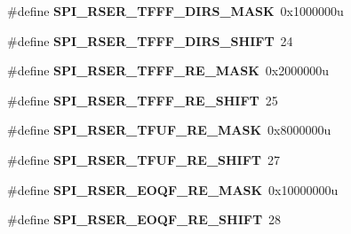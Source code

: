 \begin{DoxyCompactItemize}
\item 
\#define {\bfseries S\+P\+I\+\_\+\+R\+S\+E\+R\+\_\+\+T\+F\+F\+F\+\_\+\+D\+I\+R\+S\+\_\+\+M\+A\+SK}~0x1000000u\hypertarget{group__SPI__Register__Masks_ga01228112dcc4440aa1678eb55b97306e}{}\label{group__SPI__Register__Masks_ga01228112dcc4440aa1678eb55b97306e}

\item 
\#define {\bfseries S\+P\+I\+\_\+\+R\+S\+E\+R\+\_\+\+T\+F\+F\+F\+\_\+\+D\+I\+R\+S\+\_\+\+S\+H\+I\+FT}~24\hypertarget{group__SPI__Register__Masks_ga9f1684fdb2e7f9e9adb7afd07a3278da}{}\label{group__SPI__Register__Masks_ga9f1684fdb2e7f9e9adb7afd07a3278da}

\item 
\#define {\bfseries S\+P\+I\+\_\+\+R\+S\+E\+R\+\_\+\+T\+F\+F\+F\+\_\+\+R\+E\+\_\+\+M\+A\+SK}~0x2000000u\hypertarget{group__SPI__Register__Masks_ga1bb1c8b3d77e69e8ea3197b2a26392cb}{}\label{group__SPI__Register__Masks_ga1bb1c8b3d77e69e8ea3197b2a26392cb}

\item 
\#define {\bfseries S\+P\+I\+\_\+\+R\+S\+E\+R\+\_\+\+T\+F\+F\+F\+\_\+\+R\+E\+\_\+\+S\+H\+I\+FT}~25\hypertarget{group__SPI__Register__Masks_ga6b7e6d97146fb2244a8b1fb870cf980b}{}\label{group__SPI__Register__Masks_ga6b7e6d97146fb2244a8b1fb870cf980b}

\item 
\#define {\bfseries S\+P\+I\+\_\+\+R\+S\+E\+R\+\_\+\+T\+F\+U\+F\+\_\+\+R\+E\+\_\+\+M\+A\+SK}~0x8000000u\hypertarget{group__SPI__Register__Masks_ga245d7987838cad9b4392b051fbd6fb06}{}\label{group__SPI__Register__Masks_ga245d7987838cad9b4392b051fbd6fb06}

\item 
\#define {\bfseries S\+P\+I\+\_\+\+R\+S\+E\+R\+\_\+\+T\+F\+U\+F\+\_\+\+R\+E\+\_\+\+S\+H\+I\+FT}~27\hypertarget{group__SPI__Register__Masks_ga42ef57e6e872c54f15ba9742f98ea522}{}\label{group__SPI__Register__Masks_ga42ef57e6e872c54f15ba9742f98ea522}

\item 
\#define {\bfseries S\+P\+I\+\_\+\+R\+S\+E\+R\+\_\+\+E\+O\+Q\+F\+\_\+\+R\+E\+\_\+\+M\+A\+SK}~0x10000000u\hypertarget{group__SPI__Register__Masks_ga41b148811704b6e9903262dbd1d72433}{}\label{group__SPI__Register__Masks_ga41b148811704b6e9903262dbd1d72433}

\item 
\#define {\bfseries S\+P\+I\+\_\+\+R\+S\+E\+R\+\_\+\+E\+O\+Q\+F\+\_\+\+R\+E\+\_\+\+S\+H\+I\+FT}~28\hypertarget{group__SPI__Register__Masks_ga93b9a7fbf5962c0e407879c781779ac4}{}\label{group__SPI__Register__Masks_ga93b9a7fbf5962c0e407879c781779ac4}


\end{DoxyCompactItemize}
